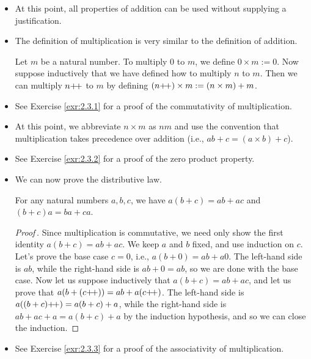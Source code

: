 \documentclass[../main.tex]{subfiles}
\begin{document}
\begin{itemize}
    \item {}At this point, all properties of addition can be used without supplying a justification.
    \item The definition of multiplication is very similar to the definition of addition.
    \begin{defn}\label{dfn:multiplication}
        Let $m$ be a natural number. To multiply 0 to $m$, we define $0\times m:=0$. Now suppose inductively that we have defined how to multiply $n$ to $m$. Then we can multiply $n{+\!+}$ to $m$ by defining $(n{+\!+})\times m:=(n\times m)+m$. 
    \end{defn}
    \item See Exercise \ref{exr:2.3.1} for a proof of the commutativity of multiplication.
    \item At this point, we abbreviate $n\times m$ as $nm$ and use the convention that multiplication takes precedence over addition (i.e., $ab+c=(a\times b)+c$).
    \item See Exercise \ref{exr:2.3.2} for a proof of the zero product property.
    \item We can now prove the distributive law.
    \begin{prop}\label{prp:distributive}
        For any natural numbers $a,b,c$, we have $a(b+c)=ab+ac$ and $(b+c)a=ba+ca$.
        \begin{proof}[Proof\,\footnotemark]
            Since multiplication is commutative, we need only show the first identity $a(b+c)=ab+ac$. We keep $a$ and $b$ fixed, and use induction on $c$. Let's prove the base case $c=0$, i.e., $a(b+0)=ab+a0$. The left-hand side is $ab$, while the right-hand side is $ab+0=ab$, so we are done with the base case. Now let us suppose inductively that $a(b+c)=ab+ac$, and let us prove that $a(b+(c{+\!+}))=ab+a(c{+\!+})$. The left-hand side is $a((b+c){+\!+})=a(b+c)+a$, while the right-hand side is $ab+ac+a=a(b+c)+a$ by the induction hypothesis, and so we can close the induction.
        \end{proof}
    \end{prop}
    \item See Exercise \ref{exr:2.3.3} for a proof of the associativity of multiplication.

\end{itemize}
\end{document}
